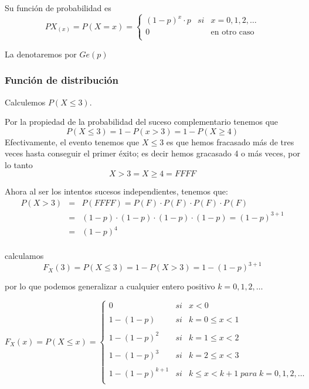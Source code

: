 \documentclass[
]{article}
\begin{document}
Su función de probabilidad es
\[PX_(x) = P(X=x) = \left\{\begin{array}{rcl}
  (1-p)^x\cdot p&si&x=0,1,2,\ldots\\
  0&& \mbox{en otro caso}\\
\end{array}\right.\]

La denotaremos por \(Ge(p)\)

\hypertarget{funciuxf3n-de-distribuciuxf3n-1}{%
\subsubsection{Función de
distribución}\label{funciuxf3n-de-distribuciuxf3n-1}}

Calculemos \(P(X\leq 3)\).

Por la propiedad de la probabilidad del suceso complementario tenemos
que \[P(X\leq 3) = 1 -P(x>3) = 1-P(X\geq 4)\] Efectivamente, el evento
tenemos que \(X\leq 3\) es que hemos fracasado más de tres veces hasta
conseguir el primer éxito; es decir hemos gracasado 4 o más veces, por
lo tanto \[{X>3} = {X\geq4} = {FFFF}\]

Ahora al ser los intentos sucesos independientes, tenemos que:
\[\begin{array}{rcl}
  P(X>3)&=&P({FFFF}) = P(F)\cdot P(F)\cdot P(F)\cdot P(F)\\
  &=&(1-p)\cdot (1-p)\cdot (1-p)\cdot (1-p) = (1-p)^{3+1} \\
  &=&(1-p)^4\\
\end{array}\]

calculamos \[F_X(3) = P(X\leq 3) = 1-P(X>3) = 1-(1-p)^{3+1}\]

por lo que podemos generalizar a cualquier entero positivo
\(k=0,1,2,\ldots\)

\[F_X(x) = P(X\leq x) = \left\{\begin{array}{rcl}
  0&si&x<0\\\\
  1-(1-p)&si&k= 0 \leq x < 1\\\\
  1-(1-p)^2&si& k = 1\leq x < 2\\\\
  1-(1-p)^3&si& k = 2\leq x < 3\\\\
  1-(1-p)^{k+1}&si& k\leq x < k+1 \; para \; k=0,1,2,\ldots\\
\end{array}\right.\]
\end{document}
